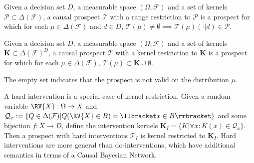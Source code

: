


\begin{definition}
Given a decision set $D$, a measurable space $(\Omega,\mathcal{F})$ and a set of kernels $\mathcal{P}\subset\Delta(\mathcal{F})$, a causal prospect $\mathscr{T}$ with a range restriction to $\mathcal{P}$ is a prospect for which for each $\mu\in \Delta(\mathcal{F})$ and $d\in D$,  $\mathscr{T}(\mu)\neq\emptyset \implies \mathscr{T}(\mu)(\cdot|d)\in \mathcal{P}$.
\end{definition}

\begin{definition}
Given a decision set $D$, a measurable space $(\Omega,\mathcal{F})$ and a set of kernels $\mathbf{K}\subset \Delta(\mathcal{F})^D$, a causal prospect $\mathscr{T}$ with a kernel restriction to $\mathbf{K}$ is a prospect for which for each $\mu\in \Delta(\mathcal{F})$,  $\mathscr{T}(\mu)\subset \mathbf{K}\cup\emptyset$.

The empty set indicates that the prospect is not valid on the distribution $\mu$.

A hard intervention is a special case of kernel restriction. Given a random variable $\RV{X}:\Omega\to X$ and $\mathcal{Q}_x:= \{Q\in\Delta(\mathcal{F})|Q(\RV{X}\in B)= \llbracket x\in B\rrbracket\}$ and some bijection $f:X\to D$, define the intervention kernels $\mathbf{K}_{I}=\{K|\forall x:K(x)\in \mathcal{Q}_x\}$. Then a prospect with hard interventions $\mathscr{T}_{I}$ is kernel restricted to $\mathbf{K}_{I}$. Hard interventions are more general than do-interventions, which have additional semantics in terms of a Causal Bayesian Network.
\end{definition}

